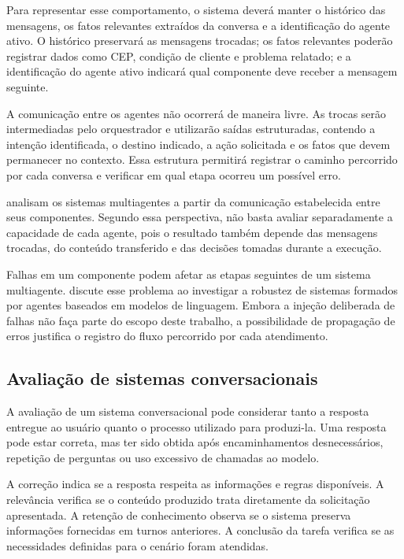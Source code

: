 Para representar esse comportamento, o sistema deverá manter o histórico das mensagens, os fatos relevantes extraídos da conversa e a identificação do agente ativo. O histórico preservará as mensagens trocadas; os fatos relevantes poderão registrar dados como CEP, condição de cliente e problema relatado; e a identificação do agente ativo indicará qual componente deve receber a mensagem seguinte.

A comunicação entre os agentes não ocorrerá de maneira livre. As trocas serão intermediadas pelo orquestrador e utilizarão saídas estruturadas, contendo a intenção identificada, o destino indicado, a ação solicitada e os fatos que devem permanecer no contexto. Essa estrutura permitirá registrar o caminho percorrido por cada conversa e verificar em qual etapa ocorreu um possível erro.

\textcite{yan2026} analisam os sistemas multiagentes a partir da comunicação estabelecida entre seus componentes. Segundo essa perspectiva, não basta avaliar separadamente a capacidade de cada agente, pois o resultado também depende das mensagens trocadas, do conteúdo transferido e das decisões tomadas durante a execução.

Falhas em um componente podem afetar as etapas seguintes de um sistema multiagente. \textcite{owotogbe2025} discute esse problema ao investigar a robustez de sistemas formados por agentes baseados em modelos de linguagem. Embora a injeção deliberada de falhas não faça parte do escopo deste trabalho, a possibilidade de propagação de erros justifica o registro do fluxo percorrido por cada atendimento.

\subsection{Avaliação de sistemas conversacionais}
\label{subsec:avaliacao-conversacional}

A avaliação de um sistema conversacional pode considerar tanto a resposta entregue ao usuário quanto o processo utilizado para produzi-la. Uma resposta pode estar correta, mas ter sido obtida após encaminhamentos desnecessários, repetição de perguntas ou uso excessivo de chamadas ao modelo.

A correção indica se a resposta respeita as informações e regras disponíveis. A relevância verifica se o conteúdo produzido trata diretamente da solicitação apresentada. A retenção de conhecimento observa se o sistema preserva informações fornecidas em turnos anteriores. A conclusão da tarefa verifica se as necessidades definidas para o cenário foram atendidas.

